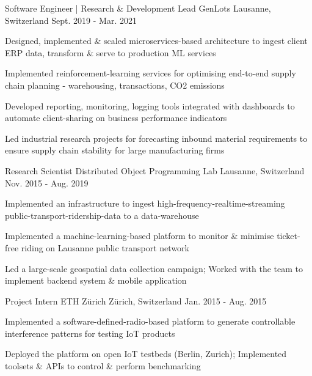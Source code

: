 \begin{cventries}
  \cventry
    {Software Engineer | Research \& Development Lead} %
    {GenLots} %
    {Lausanne, Switzerland} %
    {Sept. 2019 - Mar. 2021} %
    {
      \begin{cvitems} %
        \item {Designed, implemented \& scaled microservices-based architecture to ingest client ERP data, transform \& serve to production ML services}
      	\item {Implemented reinforcement-learning services for optimising end-to-end supply chain planning - warehousing, transactions, CO2 emissions}
        \item {Developed reporting, monitoring, logging tools integrated with dashboards to automate client-sharing on business performance indicators}
        \item {Led industrial research projects for forecasting inbound material requirements to ensure supply chain stability for large manufacturing firms}
      \end{cvitems}
    } 
   

  \cventry
    {Research Scientist} %
    {Distributed Object Programming Lab} %
    {Lausanne, Switzerland} %
    {Nov. 2015 - Aug. 2019} %
    {
      \begin{cvitems} %
      	\item {Implemented an infrastructure to ingest high-frequency-realtime-streaming public-transport-ridership-data to a data-warehouse}
      	\item {Implemented a machine-learning-based platform to monitor \& minimise ticket-free riding on Lausanne public transport network}
        \item {Led a large-scale geospatial data collection campaign; Worked with the team to implement backend system \& mobile application}
      \end{cvitems}
    }


  \cventry
    {Project Intern} %
    {ETH Zürich} %
    {Zürich, Switzerland} %
    {Jan. 2015 - Aug. 2015} %
    {
      \begin{cvitems} %
      	\item {Implemented a software-defined-radio-based platform to generate controllable interference patterns for testing IoT products}
        \item {Deployed the platform on open IoT testbeds (Berlin, Zurich); Implemented toolsets \& APIs to control \& perform benchmarking}
      \end{cvitems}
    }


\end{cventries}
